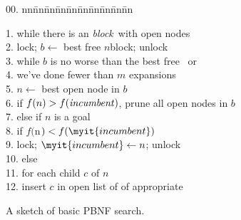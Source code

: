 \documentclass{article}
\newcommand{\bncode}{
  \begin{tabbing}
    00. nn\=nn\=nn\=nn\=nn\=nn\=nn\=nn\=nn\=nn\kill
}
\newcommand{\ecode}{
  \end{tabbing}
}
\begin{document}
\begin{figure}
\bncode
1. while there is an {\it block}\ with open nodes \\
2. \> lock; $b \leftarrow$ best free $n$block; unlock \\
3. \> while $b$ is no worse than the best free \nblock\ or \\
4. \> \> \> we've done fewer than $m$ expansions \\
5. \> \> $n \leftarrow$ best open node in $b$ \\
6. \> \> if $f(n) > f({\it incumbent})$, prune all open nodes in $b$ \\
7. \> \> else if $n$ is a goal \\
8. \> \> \> if $f($n$) < f(\myit{incumbent})$ \\
9. \> \> \> \> lock; $\myit{incumbent} \leftarrow n$; unlock \\
10. \> \> else \\
11. \> \> \> for each child $c$ of $n$ \\
12. \> \> \> \> insert $c$ in open list of of appropriate \nblock \\
\ecode
\caption{A sketch of basic PBNF search.}
\label{alg:pbnfsearch}
\end{figure}
\end{document}
